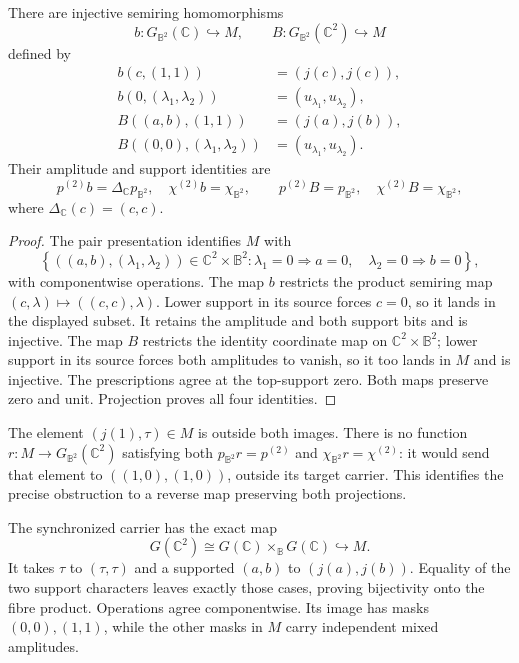 \begin{proposition}
\label{prop:sz-two-channel-embeddings}
There are injective semiring homomorphisms
\[
b:G_{\mathbb B^2}(\mathbb C)\hookrightarrow M,\qquad
B:G_{\mathbb B^2}(\mathbb C^2)\hookrightarrow M
\]
defined by
\[
\begin{aligned}
b(c,(1,1))&=(j(c),j(c)),\\
b(0,(\lambda_1,\lambda_2))&=(u_{\lambda_1},u_{\lambda_2}),\\
B((a,b),(1,1))&=(j(a),j(b)),\\
B((0,0),(\lambda_1,\lambda_2))&=(u_{\lambda_1},u_{\lambda_2}).
\end{aligned}
\]
Their amplitude and support identities are
\[
p^{(2)}b=\Delta_{\mathbb C}p_{\mathbb B^2},\quad
\chi^{(2)}b=\chi_{\mathbb B^2},\qquad
p^{(2)}B=p_{\mathbb B^2},\quad
\chi^{(2)}B=\chi_{\mathbb B^2},
\]
where $\Delta_{\mathbb C}(c)=(c,c)$.
\end{proposition}
\begin{proof}
The pair presentation identifies $M$ with
\[
\left\{((a,b),(\lambda_1,\lambda_2))\in\mathbb C^2\times\mathbb B^2:
\lambda_1=0\Rightarrow a=0,\quad\lambda_2=0\Rightarrow b=0\right\},
\]
with componentwise operations. The map $b$ restricts the product semiring map $(c,\lambda)\mapsto((c,c),\lambda)$. Lower support in its source forces $c=0$, so it lands in the displayed subset. It retains the amplitude and both support bits and is injective. The map $B$ restricts the identity coordinate map on $\mathbb C^2\times\mathbb B^2$; lower support in its source forces both amplitudes to vanish, so it too lands in $M$ and is injective. The prescriptions agree at the top-support zero. Both maps preserve zero and unit. Projection proves all four identities.
\end{proof}

The element $(j(1),\tau)\in M$ is outside both images. There is no function $r:M\to G_{\mathbb B^2}(\mathbb C^2)$ satisfying both $p_{\mathbb B^2}r=p^{(2)}$ and $\chi_{\mathbb B^2}r=\chi^{(2)}$: it would send that element to $((1,0),(1,0))$, outside its target carrier. This identifies the precise obstruction to a reverse map preserving both projections.

The synchronized carrier has the exact map
\[
G(\mathbb C^2)\cong G(\mathbb C)\times_{\mathbb B}G(\mathbb C)\hookrightarrow M.
\]
It takes $\tau$ to $(\tau,\tau)$ and a supported $(a,b)$ to $(j(a),j(b))$. Equality of the two support characters leaves exactly those cases, proving bijectivity onto the fibre product. Operations agree componentwise. Its image has masks $(0,0),(1,1)$, while the other masks in $M$ carry independent mixed amplitudes.

